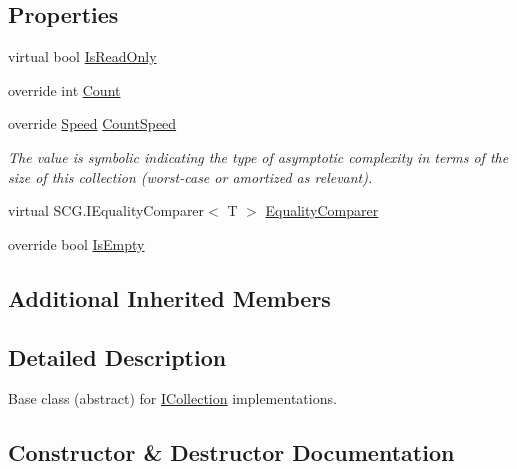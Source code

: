 \subsection*{Properties}
\begin{DoxyCompactItemize}
\item 
virtual bool \hyperlink{class_c5_1_1_collection_base_a4f9fea0df76b43f0c705fbc79a891bb9}{Is\+Read\+Only}
\item 
override int \hyperlink{class_c5_1_1_collection_base_abd3c5c23faf3d44196d125676ae03039}{Count}
\item 
override \hyperlink{namespace_c5_a615ba88dcdaa8d5a3c5f833a73d7fad6}{Speed} \hyperlink{class_c5_1_1_collection_base_a2c5361c8da79a23905c1730bb3cfce5b}{Count\+Speed}
\begin{DoxyCompactList}\small\item\em The value is symbolic indicating the type of asymptotic complexity in terms of the size of this collection (worst-\/case or amortized as relevant). \end{DoxyCompactList}\item 
virtual S\+C\+G.\+I\+Equality\+Comparer$<$ T $>$ \hyperlink{class_c5_1_1_collection_base_ab3c81e20f42c012d8ff6b5658889d108}{Equality\+Comparer}
\item 
override bool \hyperlink{class_c5_1_1_collection_base_a28a325cf904f11def90daf27c98007f6}{Is\+Empty}
\end{DoxyCompactItemize}
\subsection*{Additional Inherited Members}


\subsection{Detailed Description}
Base class (abstract) for \hyperlink{interface_c5_1_1_i_collection}{I\+Collection} implementations. 



\subsection{Constructor \& Destructor Documentation}
\hypertarget{class_c5_1_1_collection_base_a30a3c7a3e0ce42c2f768db2788657dc5}{}
